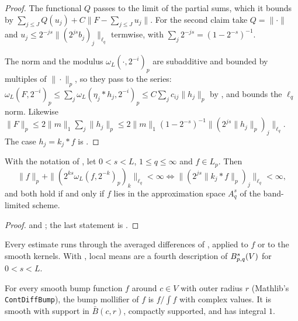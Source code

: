 \begin{proof}
\leanok
The functional $Q$ passes to the limit of the partial sums, which it bounds by
$\sum_{j \leq J} Q(u_j) + C \|F - \sum_{j \leq J} u_j\|$. For the second claim take $Q = \|\cdot\|$
and $u_j \leq 2^{-js} \|(2^{js} b_j)_j\|_{\ell_q}$ termwise, with
$\sum_j 2^{-js} = (1 - 2^{-s})^{-1}$.

The norm and the modulus $\omega_L(\cdot, 2^{-i})_p$ are subadditive and bounded by multiples of
$\|\cdot\|_p$, so they pass to the series:
$\omega_L(F, 2^{-i})_p \leq \sum_j \omega_L(\eta_j * h_j, 2^{-i})_p \leq C \sum_j c_{ij}
\|h_j\|_p$ by , and  bounds the
$\ell_q$ norm. Likewise $\|F\|_p \leq 2 \|m\|_1 \sum_j \|h_j\|_p \leq 2 \|m\|_1 (1 - 2^{-s})^{-1}
\|(2^{js} \|h_j\|_p)_j\|_{\ell_q}$. The case $h_j = k_j * f$ is .
\end{proof}

\begin{theorem}
\label{thm:local-means}
\leanok
{}
With the notation of , let $0 < s < L$, $1 \leq q \leq \infty$ and
$f \in L_p$. Then
\[
  \|f\|_p + \|(2^{ks} \omega_L(f, 2^{-k})_p)_k\|_{\ell_q} < \infty
  \iff \|(2^{js} \|k_j * f\|_p)_j\|_{\ell_q} < \infty ,
\]
and both hold if and only if $f$ lies in the approximation space $A^s_q$ of the band-limited
scheme.
\end{theorem}

\begin{proof}
\leanok
{} and ; the last statement is
.
\end{proof}

Every estimate runs through the averaged differences of , applied
to $f$ or to the smooth kernels. With , local means are a fourth description of
$B^{s}_{p,q}(V)$ for $0 < s < L$.

\begin{definition}
\label{def:bump-mollifier}
\leanok
For every smooth bump function $f$ around $c \in V$ with outer radius $r$ (Mathlib's
\texttt{ContDiffBump}), the bump mollifier of $f$ is $f / \int f$ with complex values. It is
smooth with support in $\bar B(c, r)$, compactly supported, and has integral $1$.
\end{definition}

